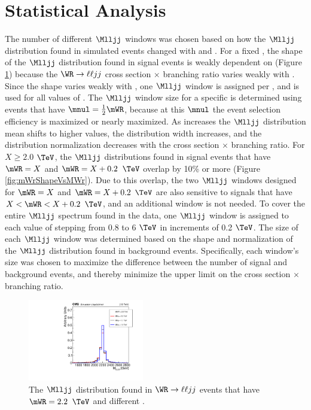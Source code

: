 \section{Statistical Analysis}
\label{sec:statAnalysis}
The number of different $\Mlljj$ windows was chosen based on how the $\Mlljj$ distribution found in simulated \WR events 
changed with \mWR and \mnul.  For a fixed \mWR, the shape of the $\Mlljj$ distribution found in signal 
events is weakly dependent on \mnul (Figure \ref{fig:mWrShapeVsMNu}) because the $\WR \rightarrow \ell\ell jj$ cross 
section $\times$ branching ratio varies weakly with \mnul.  Since the shape varies weakly with \mnul, one $\Mlljj$ window is 
assigned per \mWR, and is used for all values of \mnul.  The $\Mlljj$ window size for a specific \mWR is determined using events that have 
$\mnul = \frac{1}{2}\mWR$, because at this $\mnul$ the event selection efficiency is maximized or nearly maximized.  As \mWR 
increases the $\Mlljj$ distribution mean shifts to higher values, the distribution width increases, and the distribution normalization 
decreases with the \WR cross section $\times$ branching ratio.  For $X \geq 2.0$ $\TeV$, the $\Mlljj$ distributions 
found in signal events that have $\mWR = X$ and $\mWR = X + 0.2$ $\TeV$ overlap by 10\% or more (Figure \ref{fig:mWrShapeVsMWr}).  
Due to this overlap, the two $\Mlljj$ windows designed for $\mWR = X$ and $\mWR = X + 0.2$ $\TeV$ are also sensitive to signals 
that have $X < \mWR < X + 0.2$ $\TeV$, and an additional window is not needed.  To cover the entire $\Mlljj$ spectrum found in the 
data, one $\Mlljj$ window is assigned to each value of \mWR stepping from 0.8 to 6 $\TeV$ in increments of 0.2 $\TeV$.  The size 
of each $\Mlljj$ window was determined based on the shape and normalization of the $\Mlljj$ distribution found in background 
events.  Specifically, each window's size was chosen to maximize the difference between the number of signal and background 
events, and thereby minimize the upper limit on the \WR cross section $\times$ branching ratio.

\clearpage
\begin{figure}[h]
	\centering
	\includegraphics[width=0.45\textwidth]{figures/massGenFstHvyPtcl_MWR_2200_several_MNu_private.pdf}
	\caption{The $\Mlljj$ distribution found in $\WR \rightarrow \ell\ell jj$ events that have $\mWR = 2.2$ $\TeV$ 
	and different \mnul.}
	\label{fig:mWrShapeVsMNu}
\end{figure}

